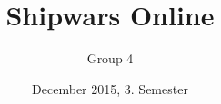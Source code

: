 \documentclass[10pt, a4paper]{report}
\begin{document}
\title{Shipwars Online}
\author{Group 4}
\date{December 2015, 3. Semester}
\maketitle
\tableofcontents
\listoffigures
\listoftables
%
%
%
%

%
%
%
%
%
%
%
%
%
%
%
\end{document}

